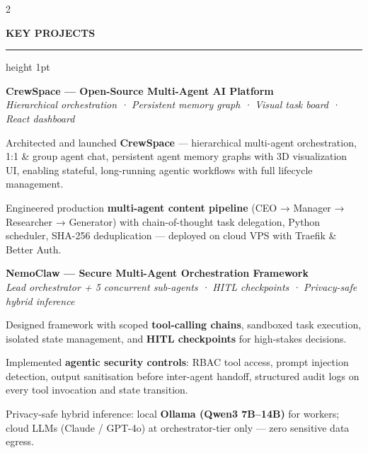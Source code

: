 \documentclass[10pt, a4paper]{article}
\newcommand{\mainHeading}[1]{%
  \vspace{2pt}%
  {\fontsize{6.8pt}{6.8pt}\selectfont
   \textcolor{ruleLine}{\bfseries\MakeUppercase{#1}}}%
  \vspace{2pt}%
  \textcolor{ruleLine}{\hrule height 1pt}%
  \vspace{6pt}%
}
\newcommand{\projentry}[3]{%
  \vspace{1pt}%
  {\fontsize{9pt}{9pt}\selectfont\textbf{\textcolor{mainDark}{#1}}}\\[-1pt]%
  {\fontsize{7.5pt}{7.5pt}\selectfont\textit{\textcolor{companyCol}{#2}}}%
  \vspace{2pt}%
  #3
  \vspace{7pt}%
}
\begin{document}
\begin{paracol}{2}
\begin{minipage}{\linewidth-14pt}
\mainHeading{Key Projects}

\projentry%
  {CrewSpace — Open-Source Multi-Agent AI Platform}%
  {Hierarchical orchestration · Persistent memory graph · Visual task board · React dashboard}%
  {%
    \begin{cvbullets}
      \item[\textcolor{bulletCol}{\scriptsize$\blacktriangleright$}]
        Architected and launched \textbf{CrewSpace} — hierarchical multi-agent orchestration,
        1:1 \& group agent chat, persistent agent memory graphs with 3D visualization UI,
        enabling stateful, long-running agentic workflows with full lifecycle management.
      \item[\textcolor{bulletCol}{\scriptsize$\blacktriangleright$}]
        Engineered production \textbf{multi-agent content pipeline} (CEO → Manager → Researcher
        → Generator) with chain-of-thought task delegation, Python scheduler, SHA-256
        deduplication — deployed on cloud VPS with Traefik \& Better Auth.
    \end{cvbullets}%
  }

\projentry%
  {NemoClaw — Secure Multi-Agent Orchestration Framework}%
  {Lead orchestrator + 5 concurrent sub-agents · HITL checkpoints · Privacy-safe hybrid inference}%
  {%
    \begin{cvbullets}
      \item[\textcolor{bulletCol}{\scriptsize$\blacktriangleright$}]
        Designed framework with scoped \textbf{tool-calling chains}, sandboxed task execution,
        isolated state management, and \textbf{HITL checkpoints} for high-stakes decisions.
      \item[\textcolor{bulletCol}{\scriptsize$\blacktriangleright$}]
        Implemented \textbf{agentic security controls}: RBAC tool access, prompt injection
        detection, output sanitisation before inter-agent handoff, structured audit logs on
        every tool invocation and state transition.
      \item[\textcolor{bulletCol}{\scriptsize$\blacktriangleright$}]
        Privacy-safe hybrid inference: local \textbf{Ollama (Qwen3 7B–14B)} for workers;
        cloud LLMs (Claude / GPT-4o) at orchestrator-tier only — zero sensitive data egress.
    \end{cvbullets}%
  }


\end{minipage}
\end{paracol}
\end{document}
